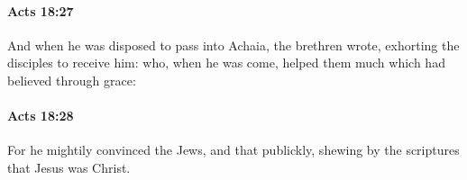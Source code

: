 		\paragraph{Acts 18:27} %
			\label{ACTS-18-27}

			And when he was disposed to pass into Achaia, the brethren wrote, exhorting the disciples to receive him: who, when he was come, helped them much which had believed through grace:

			\begin{framed}
			\scriptsize
				\begin{compactdesc}
					\item[SBLG] 
				\end{compactdesc}
			\end{framed}

		\paragraph{Acts 18:28} %
			\label{ACTS-18-28}

			For he mightily convinced the Jews, and that publickly, shewing by the scriptures that Jesus was Christ.

